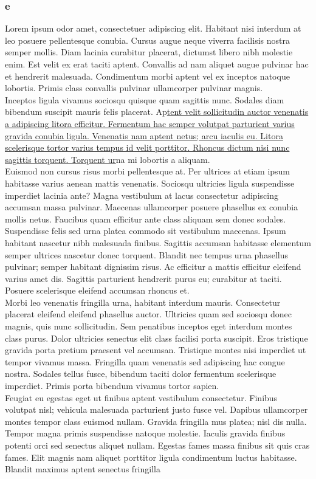 \documentclass{article}
\begin{document}
\subsubsection{\textnormal{e}}
Lorem ipsum odor amet, consectetuer adipiscing elit. Habitant nisi interdum at leo posuere pellentesque conubia. Cursus augue neque viverra facilisis nostra semper mollis. Diam lacinia curabitur placerat, dictumst libero nibh molestie enim. Est velit ex erat taciti aptent. Convallis ad nam aliquet augue pulvinar hac et hendrerit malesuada. Condimentum morbi aptent vel ex inceptos natoque lobortis. Primis class convallis pulvinar ullamcorper pulvinar magnis.\\Inceptos ligula vivamus sociosqu quisque quam sagittis nunc. Sodales diam bibendum suscipit mauris felis placerat. Ap\uline{tent velit sollicitudin auctor venenatis a adipiscing litora efficitur. Fermentum hac semper volutpat parturient varius gravida conubia ligula. Venenatis nam aptent netus; arcu iaculis eu. Litora scelerisque tortor varius tempus id velit porttitor. Rhoncus dictum nisi nunc sagittis torquent. Torquent ur}na mi lobortis a aliquam.\\Euismod non cursus risus morbi pellentesque at. Per ultrices at etiam ipsum habitasse varius aenean mattis venenatis. Sociosqu ultricies ligula suspendisse imperdiet lacinia ante? Magna vestibulum at lacus consectetur adipiscing accumsan massa pulvinar. Maecenas ullamcorper posuere phasellus ex conubia mollis netus. Faucibus quam efficitur ante class aliquam sem donec sodales.\\Suspendisse felis sed urna platea commodo sit vestibulum maecenas. Ipsum habitant nascetur nibh malesuada finibus. Sagittis accumsan habitasse elementum semper ultrices nascetur donec torquent. Blandit nec tempus urna phasellus pulvinar; semper habitant dignissim risus. Ac efficitur a mattis efficitur eleifend varius amet dis. Sagittis parturient hendrerit purus eu; curabitur at taciti. Posuere scelerisque eleifend accumsan rhoncus et.\\Morbi leo venenatis fringilla urna, habitant interdum mauris. Consectetur placerat eleifend eleifend phasellus auctor. Ultricies quam sed sociosqu donec magnis, quis nunc sollicitudin. Sem penatibus inceptos eget interdum montes class purus. Dolor ultricies senectus elit class facilisi porta suscipit. Eros tristique gravida porta pretium praesent vel accumsan. Tristique montes nisi imperdiet ut tempor vivamus massa. Fringilla quam venenatis sed adipiscing hac congue nostra. Sodales tellus fusce, bibendum taciti dolor fermentum scelerisque imperdiet. Primis porta bibendum vivamus tortor sapien.\\Feugiat eu egestas eget ut finibus aptent vestibulum consectetur. Finibus volutpat nisl; vehicula malesuada parturient justo fusce vel. Dapibus ullamcorper montes tempor class euismod nullam. Gravida fringilla mus platea; nisl dis nulla. Tempor magna primis suspendisse natoque molestie. Iaculis gravida finibus potenti orci sed senectus aliquet nullam. Egestas fames massa finibus sit quis cras fames. Elit magnis nam aliquet porttitor ligula condimentum luctus habitasse.\\Blandit maximus aptent senectus fringilla 
\end{document}
